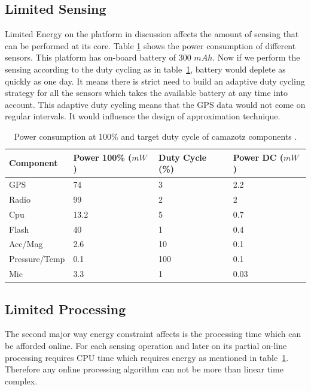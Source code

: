 \documentclass[conference]{IEEEtran}
\begin{document}
\subsection{Limited Sensing}\label{sec:limited-sensing}
Limited Energy on the platform in discussion affects the amount of sensing that can be performed at its core. Table \ref{tab:power-consumption} shows the power consumption of different sensors. This platform has on-board battery of 300 $mAh$. Now if we perform the sensing according to the duty cycling as in table~\ref{tab:power-consumption}, battery would deplete as quickly as one day. It means there is strict need to build an adaptive duty cycling strategy for all the sensors which takes the available battery at any time into account. This adaptive duty cycling means that the GPS data would not come on regular intervals. It would influence the design of approximation technique. 
\begin{table}[h]
\caption{Power consumption at 100\% and target duty cycle of camazotz components \cite{raja-ipsn}.}
\label{tab:power-consumption}
    \begin{center}
    \begin{tabular}{   l  l  l  l }
    \hline
    Component & Power 100\% ($mW$) & Duty Cycle (\%) & Power DC ($mW$)\\ \hline
    GPS & 74 & 3 & 2.2 \\ \hline
    Radio & 99 & 2 & 2 \\ \hline
    Cpu & 13.2 & 5 & 0.7 \\ \hline    
    Flash & 40 & 1 & 0.4 \\ \hline    
    Acc/Mag & 2.6 & 10 & 0.1 \\ \hline
    Pressure/Temp & 0.1 & 100 & 0.1 \\ \hline
    Mic & 3.3 & 1 & 0.03 \\ \hline
    \end{tabular}
    \end{center}
\end{table}
\subsection{Limited Processing}
The second major way energy constraint affects is the processing time which can be afforded online. For each sensing operation and later on its partial on-line processing requires CPU time which requires energy as mentioned in table~\ref{tab:power-consumption}. Therefore any online processing algorithm can not be more than linear time complex.
\end{document}
